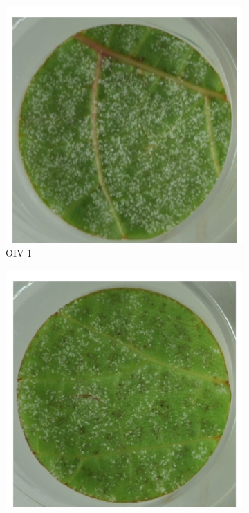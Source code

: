 \documentclass[english]{article}
\begin{document}
\paragraph{}
\begin{figure}[H]
    \centering
    \begin{subfigure}[b]{0.3\linewidth}
        \includegraphics[width=\linewidth]{oiv1.png}
        \caption{OIV 1}\label{fig:oiv1}
    \end{subfigure}
    \begin{subfigure}[b]{0.3\linewidth}
        \includegraphics[width=\linewidth]{oiv3.png}

\end{subfigure}
\end{figure}
\end{document}
